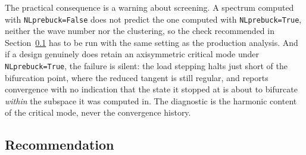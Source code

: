 \documentclass[11pt,a4paper]{article}
\begin{document}
The practical consequence is a warning about screening.  A spectrum computed
with \texttt{NLprebuck=False} does not predict the one computed with
\texttt{NLprebuck=True}, neither the wave number nor the clustering, so the
check recommended in Section~\ref{sec:cts-recommendation} has to be run with
the same setting as the production analysis.  And if a design genuinely does
retain an axisymmetric critical mode under \texttt{NLprebuck=True}, the
failure is silent: the load stepping halts just short of the bifurcation
point, where the reduced tangent is still regular, and reports convergence
with no indication that the state it stopped at is about to bifurcate
\emph{within} the subspace it was computed in.  The diagnostic is the
harmonic content of the critical mode, never the convergence history.

\subsection{Recommendation}
\label{sec:cts-recommendation}
\end{document}
